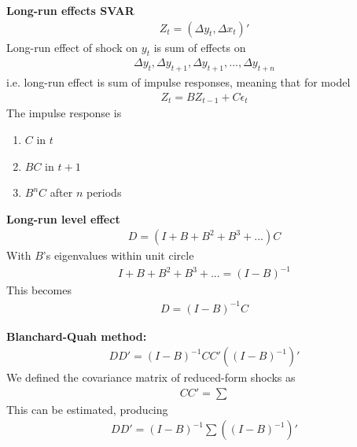 \documentclass{beamer}
\begin{document}
\begin{frame}
  \textbf{Long-run effects SVAR}
  \begin{align}
    Z_t=(\Delta y_t,\Delta x_t)'
  \end{align}
  Long-run effect of shock on $y_t$ is sum of effects on 
  \begin{align}
    \Delta y_t, \Delta y_{t+1},\Delta y_{t+1},...,\Delta y_{t+n}
  \end{align}
  i.e. long-run effect is sum of impulse responses, meaning that for model     
  \begin{align}
    Z_t = BZ_{t-1} + C\epsilon_t
  \end{align}
  The impulse response is
  \begin{enumerate}
    \item $C$ in $t$
    \item $BC$ in $t+1$
    \item $B^nC$ after $n$ periods
  \end{enumerate}  
\end{frame}

\begin{frame}
  \textbf{Long-run level effect}  
  \begin{align}
    D=(I+B+B^2+B^3+...)C
  \end{align}
  With $B$'s eigenvalues within unit circle 
  \begin{align}
    I+B+B^2+B^3+...=(I-B)^{-1}
  \end{align}
  This becomes
  \begin{align}
  D=(I-B)^{-1}C
  \end{align}
\end{frame}

\begin{frame}
  \textbf{Blanchard-Quah method:}
  \begin{align}
    DD'=(I-B)^{-1}CC'\left( (I-B)^{-1} \right)'
  \end{align}
  We defined the covariance matrix of reduced-form shocks as
  \begin{align}
    CC'= \sum 
  \end{align}
  \medskip
  This can be estimated, producing
  \begin{align}
    DD'=(I-B)^{-1}\sum \left( (I-B)^{-1} \right)'
  \end{align} 
\end{frame}
\end{document}
